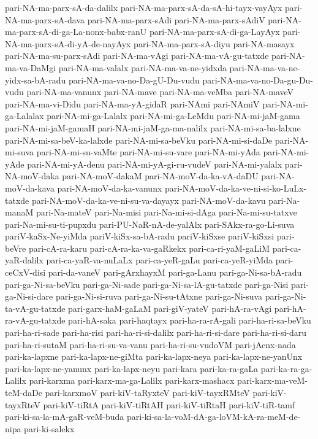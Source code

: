 {pari-NA-ma-parx-sA-da-dalilx
pari-NA-ma-parx-sA-da-sA-hi-tayx-vayAyx
pari-NA-ma-parx-sA-dava
pari-NA-ma-parx-sAdi
pari-NA-ma-parx-sAdiV
pari-NA-ma-parx-sA-di-ga-La-nonx-babx-ranU
pari-NA-ma-parx-sA-di-ga-LayAyx
pari-NA-ma-parx-sA-di-yA-de-nayAyx
pari-NA-ma-parx-sA-diyu
pari-NA-masayx
pari-NA-ma-su-parx-sAdi
pari-NA-ma-vAgi
pari-NA-ma-vA-gu-tatxde
pari-NA-ma-va-DaMgi
pari-NA-ma-valalx
pari-NA-ma-va-ne-yidxda
pari-NA-ma-va-ne-yidx-sa-bA-radu
pari-NA-ma-va-no-Da-gU-Du-vudu
pari-NA-ma-va-no-Da-gu-Du-vudu
pari-NA-ma-vanunx
pari-NA-mave
pari-NA-ma-veMba
pari-NA-maveV
pari-NA-ma-vi-Didu
pari-NA-ma-yA-gidaR
pari-NAmi
pari-NAmiV
pari-NA-mi-ga-Lalalax
pari-NA-mi-ga-Lalalx
pari-NA-mi-ga-LeMdu
pari-NA-mi-jaM-gama
pari-NA-mi-jaM-gamaH
pari-NA-mi-jaM-ga-ma-nalilx
pari-NA-mi-sa-ba-lalxne
pari-NA-mi-sa-beV-ka-lalxde
pari-NA-mi-sa-beVku
pari-NA-mi-si-daDe
pari-NA-mi-suva
pari-NA-mi-su-vaMte
pari-NA-mi-su-vare
pari-NA-mi-yAda
pari-NA-mi-yAde
pari-NA-mi-yA-denu
pari-NA-mi-yA-gi-ru-vudeV
pari-NA-mi-yalalx
pari-NA-moV-daka
pari-NA-moV-dakaM
pari-NA-moV-da-ka-vA-daDU
pari-NA-moV-da-kava
pari-NA-moV-da-ka-vanunx
pari-NA-moV-da-ka-ve-ni-si-ko-LuLx-tatxde
pari-NA-moV-da-ka-ve-ni-su-va-dayayx
pari-NA-moV-da-kavu
pari-Na-manaM
pari-Na-mateV
pari-Na-misi
pari-Na-mi-si-dAga
pari-Na-mi-su-tatxve
pari-Na-mi-su-ti-pupxdu
pari-PU-NaR-nA-de-yalAlx
pari-SAkx-ra-go-Li-suva
pariV-kaSx-Ne-yiMda
pariV-kiSx-sa-bA-radu
pariV-kiSxse
pariV-kiSxsi
pari-beVre
pari-cA-ra-karu
pari-cA-ra-ka-va-gaRkekx
pari-ca-ri-yaM-gaLiM
pari-ca-yaR-dalilx
pari-ca-yaR-va-nuLaLx
pari-ca-yeR-gaLu
pari-ca-yeR-yiMda
pari-ceCxV-disi
pari-da-vaneV
pari-gArxhayxM
pari-ga-Lanu
pari-ga-Ni-sa-bA-radu
pari-ga-Ni-sa-beVku
pari-ga-Ni-sade
pari-ga-Ni-sa-lA-gu-tatxde
pari-ga-Nisi
pari-ga-Ni-si-dare
pari-ga-Ni-si-ruva
pari-ga-Ni-su-tAtxne
pari-ga-Ni-suva
pari-ga-Ni-ta-vA-gu-tatxde
pari-garx-haM-gaLaM
pari-giV-yateV
pari-hA-ra-vAgi
pari-hA-ra-vA-gu-tatxde
pari-hA-saka
pari-haqtayx
pari-ha-ra-rA-gali
pari-ha-ri-sa-beVku
pari-ha-ri-sade
pari-ha-risi
pari-ha-ri-si-dalilx
pari-ha-ri-si-dare
pari-ha-ri-si-daru
pari-ha-ri-sutaM
pari-ha-ri-su-va-vanu
pari-ha-ri-su-vudoVM
pari-jAcnx-nada
pari-ka-lapxne
pari-ka-lapx-ne-giMta
pari-ka-lapx-neya
pari-ka-lapx-ne-yanUnx
pari-ka-lapx-ne-yanunx
pari-ka-lapx-neyu
pari-kara
pari-ka-ra-gaLa
pari-ka-ra-ga-Lalilx
pari-karxma
pari-karx-ma-ga-Lalilx
pari-karx-mashacx
pari-karx-ma-veM-teM-daDe
pari-karxmoV
pari-kiV-taRyxteV
pari-kiV-tayxRMteV
pari-kiV-tayxRteV
pari-kiV-tiRtA
pari-kiV-tiRtAH
pari-kiV-tiRtaH
pari-kiV-tiR-tamf
pari-ki-sa-la-mA-gaR-veM-buda
pari-ki-sa-la-voM-dA-ga-loVM-kA-ra-meM-de-nipa
pari-ki-salekx
}
